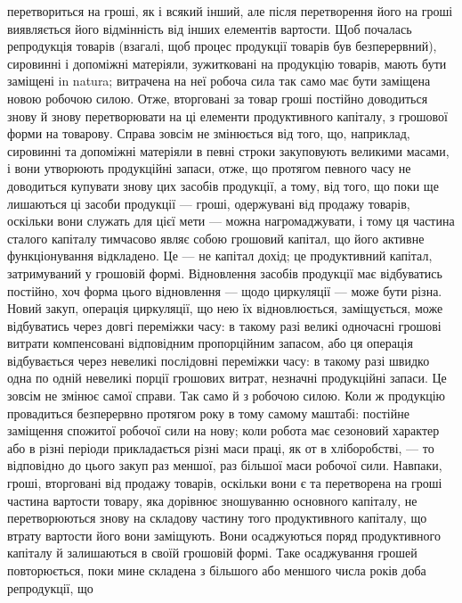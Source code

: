 \parcont{}  %
перетвориться на гроші, як і всякий інший, але після перетворення його
на гроші виявляється його відмінність від інших елементів вартости.
Щоб почалась репродукція товарів (взагалі, щоб процес продукції
товарів був безперервний), сировинні і допоміжні матеріяли, зужитковані на
продукцію товарів, мають бути заміщені in natura; витрачена на неї робоча
сила так само має бути заміщена новою робочою силою. Отже, вторговані
за товар гроші постійно доводиться знову й знову перетворювати на ці елементи
продуктивного капіталу, з грошової форми на товарову. Справа зовсім
не змінюється від того, що, наприклад, сировинні та допоміжні матеріяли
в певні строки закуповують великими масами, і вони утворюють
продукційні запаси, отже, що протягом певного часу не доводиться купувати
знову цих засобів продукції, а тому, від того, що поки ще
лишаються ці засоби продукції — гроші, одержувані від продажу товарів,
оскільки вони служать для цієї мети — можна нагромаджувати, і тому
ця частина сталого капіталу тимчасово являє собою грошовий капітал,
що його активне функціонування відкладено. Це — не капітал \deq{} дохід; це
продуктивний капітал, затримуваний у грошовій формі. Відновлення засобів
продукції має відбуватись постійно, хоч форма цього відновлення
— щодо циркуляції — може бути різна. Новий закуп, операція циркуляції,
що нею їх відновлюється, заміщується, може відбуватись через довгі переміжки
часу: в такому разі великі одночасні грошові витрати компенсовані
відповідним пропорційним запасом, або ця операція відбувається через невеликі
послідовні переміжки часу: в такому разі швидко одна по одній невеликі
порції грошових витрат, незначні продукційні запаси. Це зовсім не
змінює самої справи. Так само й з робочою силою. Коли ж продукцію
провадиться безперервно протягом року в тому самому маштабі: постійне
заміщення спожитої робочої сили на нову; коли робота має сезоновий характер
або в різні періоди прикладається різні маси праці, як от в хліборобстві,
— то відповідно до цього закуп раз меншої, раз більшої маси робочої
сили. Навпаки, гроші, вторговані від продажу товарів, оскільки вони
є та перетворена на гроші частина вартости товару, яка дорівнює зношуванню
основного капіталу, не перетворюються знову на складову частину
того продуктивного капіталу, що втрату вартости його вони заміщують.
Вони осаджуються поряд продуктивного капіталу й залишаються в своїй
грошовій формі. Таке осаджування грошей повторюється, поки мине
складена з більшого або меншого числа років доба репродукції, що
